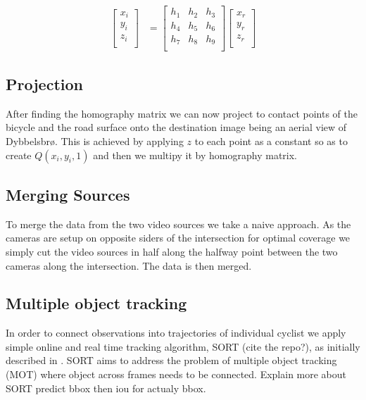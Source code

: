\documentclass[
10pt, %
a4paper, %
oneside, %
headinclude,footinclude, %
] {book}%
\begin{document}
\begin{align}
\label{eq:3}
  \begin{bmatrix}
    x_{i} \\
    y_{i} \\
    z_{i} \\
  \end{bmatrix}
  &= \begin{bmatrix}
      h_1 & h_2 & h_3 \\
      h_4 & h_5 & h_6 \\
      h_7 & h_8 & h_9 \\
  \end{bmatrix}
  \begin{bmatrix}
    x_{r} \\
    y_{r} \\
    z_{r} \\
  \end{bmatrix}
\end{align}
\subsection{Projection}

After finding the homography matrix we can now project to contact points of the bicycle and the road surface onto the destination
image being an aerial view of Dybbelsbrø. This is achieved by applying $z$ to each point as a constant so as to create $Q(x_i, y_i, 1)$ and then we multipy it by 
homography matrix. 
\ \\
\subsection{Merging Sources}

To merge the data from the two video sources we take a naive approach. As the cameras are setup on
opposite siders of the intersection for optimal coverage we simply cut the video sources in half along the halfway point between
the two cameras along the intersection. The data is then merged.
\ \\
\subsection{Multiple object tracking}

In order to connect observations into trajectories of individual cyclist we apply 
simple online and real time tracking algorithm, SORT (cite the repo?), as initially described in \cite{Bewley2016_sort}. 
SORT aims to address the problem of multiple object tracking (MOT) where object across frames needs to be connected. 
Explain more about SORT predict bbox then iou for actualy bbox.
\end{document}
